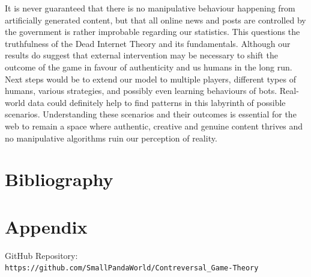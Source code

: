 \documentclass{article}
\begin{document}
It is never guaranteed that there is no manipulative behaviour happening from artificially generated content, but that all online news and posts are controlled by the government is rather improbable regarding our statistics. This questions the truthfulness of the Dead Internet Theory and its fundamentals. Although our results do suggest that external intervention may be necessary to shift the outcome of the game in favour of authenticity and us humans in the long run.\\

Next steps would be to extend our model to multiple players, different types of humans, various strategies, and possibly even learning behaviours of bots. Real-world data could definitely help to find patterns in this labyrinth of possible scenarios. Understanding these scenarios and their outcomes is essential for the web to remain a space where authentic, creative and genuine content thrives and no manipulative algorithms ruin our perception of reality.



\newpage
\section{Bibliography}




\section{Appendix}
GitHub Repository: 
\nolinkurl{https://github.com/SmallPandaWorld/Contreversal_Game-Theory}
\end{document}
